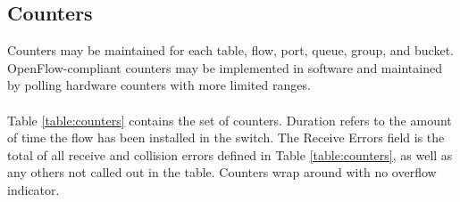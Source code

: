 \documentclass[10pt]{article}
\begin{document}
\subsection{Counters}

Counters may be maintained for each table, flow, port, queue, group, and bucket.  OpenFlow-compliant counters may be implemented in software and maintained by polling hardware counters with more limited ranges.
\\\\
Table \ref{table:counters} contains the set of counters.  Duration refers to the amount of time the flow has been installed in the switch.  The Receive Errors field is the total of all receive and collision errors defined in Table \ref{table:counters}, as well as any others not called out in the table.  Counters wrap around with no overflow indicator.
\end{document}
